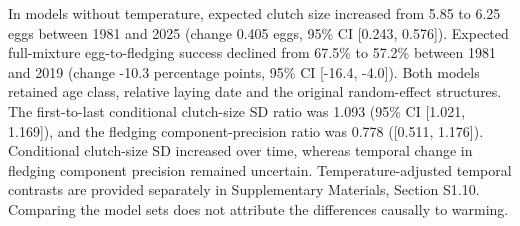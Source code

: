 \documentclass{article}
\begin{document}
In models without temperature, expected clutch size increased from 5.85 to 6.25 eggs between 1981 and 2025 (change 0.405 eggs, 95\% CI [0.243, 0.576]). Expected full-mixture egg-to-fledging success declined from 67.5\% to 57.2\% between 1981 and 2019 (change -10.3 percentage points, 95\% CI [-16.4, -4.0]). Both models retained age class, relative laying date and the original random-effect structures. The first-to-last conditional clutch-size SD ratio was 1.093 (95\% CI [1.021, 1.169]), and the fledging component-precision ratio was 0.778 ([0.511, 1.176]). Conditional clutch-size SD increased over time, whereas temporal change in fledging component precision remained uncertain. Temperature-adjusted temporal contrasts are provided separately in Supplementary Materials, Section S1.10. Comparing the model sets does not attribute the differences causally to warming.
\end{document}

